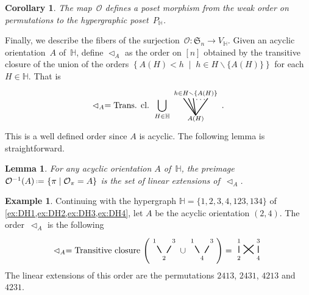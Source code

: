 \documentclass[reqno]{amsart}
\newtheorem{corollary}[theorem]{Corollary}
\newtheorem{lemma}[theorem]{Lemma}
\theoremstyle{definition}
\newtheorem{example}[theorem]{Example}
\newcommand{\set}[2]{\left\{ #1 \;\middle|\; #2 \right\}} %
\newcommand{\ssm}{\smallsetminus} %
\newcommand{\eqdef}{\mbox{\,\raisebox{0.2ex}{\scriptsize\ensuremath{\mathrm:}}\ensuremath{=}\,}} %
\newcommand{\fS}{\mathfrak{S}} %
\newcommand{\less}{\vartriangleleft} %
\newcommand{\Or}{\mathcal O}  %
\newcommand{\HH}{\mathbb H}  %
\begin{document}
\begin{corollary}
\label{coro:weakToP}
The map~$\Or$ defines a poset morphism from the weak order on permutations to the hypergraphic poset~$P_\HH$.
\end{corollary}

Finally, we describe the fibers of the surjection~$\Or : \fS_n \to V_\HH$.
Given an acyclic orientation~$A$ of~$\HH$, define $\less_A$ as the order on $[n]$ obtained by the transitive closure of the union of the \linebreak orders $\set{A(H) < h}{h \in H \ssm \{A(H)\}}$ for each $H \in \HH$.
That is
\[ 
	\less_A =  \text{Trans. cl. }
	\bigcup_{H \in \HH} 
	\begin{tikzpicture}[scale=1,baseline=.0cm]
		\node at (0,-.45) {$\scriptstyle A(H)$};
		\node at (0,.6) {$\scriptstyle h \in H \ssm \{A(H)\}$};
		\node at (.2,.35) {$\ldots$};
		\draw [thick] (0,-.3)--(-.5,.4); 
		\draw [thick] (0,-.3)--(-.3,.4); 
		\draw [thick] (0,-.3)--(-.1,.4); 
		\draw [thick] (0,-.3)--(.5,.4); 
	\end{tikzpicture} \,.
\]
This is a well defined order since $A$ is acyclic.
The following lemma is straightforward.

\begin{lemma}
\label{lem:prepi}
For any acyclic orientation $A$ of~$\HH$, the preimage $\Or^{-1}(A) \eqdef \set{\pi}{\Or_\pi=A}$ is the set of linear extensions of~$\less_A$.
\end{lemma}

\begin{example}
Continuing with the hypergraph $\HH=\{ 1, 2, 3, 4, 123, 134 \}$ of \cref{ex:DH1,ex:DH2,ex:DH3,ex:DH4}, let $A$ be the acyclic orientation $(2,4)$.
The order~$\less_A$ is the following
\[
	\less_A= \text{Transitive closure }\Bigg(
	\begin{tikzpicture}[scale=1,baseline=.2cm]
		\node (2) at (0,0) {$\scriptstyle 2$};
		\node (1) at (-.4,.7) {$\scriptstyle 1$};
		\node (3) at (.4,.7) {$\scriptstyle 3$};
		\draw [thick] (2)--(1); 
		\draw [thick] (2)--(3); 
	\end{tikzpicture} 
	\cup
	\begin{tikzpicture}[scale=1,baseline=.2cm]
		\node (4) at (0,0) {$\scriptstyle 4$};
		\node (1) at (-.4,.7) {$\scriptstyle 1$};
		\node (3) at (.4,.7) {$\scriptstyle 3$};
		\draw [thick] (4)--(1); 
		\draw [thick] (4)--(3); 
	\end{tikzpicture} 
	\Bigg)
	=
	\begin{tikzpicture}[scale=1,baseline=.2cm]
		\node (4) at (.4,0) {$\scriptstyle 4$};
		\node (2) at (-.4,0) {$\scriptstyle 2$};
		\node (1) at (-.4,.7) {$\scriptstyle 1$};
		\node (3) at (.4,.7) {$\scriptstyle 3$};
		\draw [thick] (4)--(1); 
		\draw [thick] (4)--(3); 
		\draw [thick] (2)--(1); 
		\draw [thick] (2)--(3); 
	\end{tikzpicture} 	
\]
The linear extensions of this order are the permutations $2413$, $2431$, $4213$ and $4231$.
\end{example}
\end{document}
